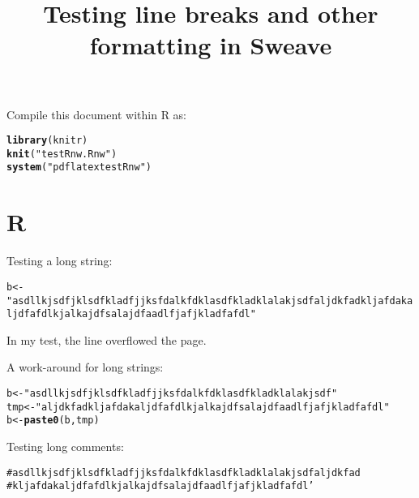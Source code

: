 \documentclass{article}\usepackage{graphicx, color}
\title{Testing line breaks and other formatting in Sweave}
\makeatletter
\newcommand{\hlfunctioncall}[1]{\textcolor[rgb]{0.501960784313725,0,0.329411764705882}{\textbf{#1}}}%
\newcommand{\hlstring}[1]{\textcolor[rgb]{0.6,0.6,1}{#1}}%
\newcommand{\hlcomment}[1]{\textcolor[rgb]{0.180392156862745,0.6,0.341176470588235}{#1}}%
\newenvironment{kframe}{%
 \def\at@end@of@kframe{}%
 \ifinner\ifhmode%
  \def\at@end@of@kframe{\end{minipage}}%
  \begin{minipage}{\columnwidth}%
 \fi\fi%
 \def\FrameCommand##1{\hskip\@totalleftmargin \hskip-\fboxsep
 \colorbox{shadecolor}{##1}\hskip-\fboxsep
     \hskip-\linewidth \hskip-\@totalleftmargin \hskip\columnwidth}%
 \MakeFramed {\advance\hsize-\width
   \@totalleftmargin\z@ \linewidth\hsize
   \@setminipage}}%
 {\par\unskip\endMakeFramed%
 \at@end@of@kframe}
\newenvironment{knitrout}{}{} %
\makeatother
\begin{document}







Compile this document within R as:
\begin{knitrout}
\color{fgcolor}\begin{kframe}
\begin{alltt}
\hlfunctioncall{library}(knitr)
\hlfunctioncall{knit}(\hlstring{"testRnw.Rnw"})
\hlfunctioncall{system}(\hlstring{"pdflatex testRnw"})
\end{alltt}
\end{kframe}
\end{knitrout}


\section{R}


Testing a long string:

\begin{knitrout}
\color{fgcolor}\begin{kframe}
\begin{alltt}
b <- \hlstring{"asdl lkjsdf jklsdf kladfj jksfd alkfd klasdf klad kla lakjsdf aljdkfad kljafda kaljdf afdlkja lkajdfsa lajdfa adlfjaf jkladf afdl"}
\end{alltt}
\end{kframe}
\end{knitrout}


In my test, the line overflowed the page.

A work-around for long strings:

\begin{knitrout}
\color{fgcolor}\begin{kframe}
\begin{alltt}
b <- \hlstring{"asdl lkjsdf jklsdf kladfj jksfd alkfd klasdf klad kla lakjsdf "}
tmp <- \hlstring{"aljdkfad kljafda kaljdf afdlkja lkajdfsa lajdfa adlfjaf jkladf afdl"}
b <- \hlfunctioncall{paste0}(b, tmp)
\end{alltt}
\end{kframe}
\end{knitrout}


Testing long comments:

\begin{knitrout}
\color{fgcolor}\begin{kframe}
\begin{alltt}
\hlcomment{# asdl lkjsdf jklsdf kladfj jksfd alkfd klasdf klad kla lakjsdf aljdkfad}
\hlcomment{# kljafda kaljdf afdlkja lkajdfsa lajdfa adlfjaf jkladf afdl'}
\end{alltt}
\end{kframe}
\end{knitrout}
\end{document}
